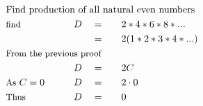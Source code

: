\begin{alignat*}{5}
&\rlap{\text{Find production of all natural even numbers}}\\
&\small\text{find}&D\quad&=\quad&&2*4*6*8*...\\
&\,&\,&=&&2(1*2*3*4*...)\\
&\rlap{\small\text{From the previous proof}}\\
&\,&D\quad&=&&2C\\
&\small\text{As }C=0\normalsize\qquad&D\quad&=&&2\cdot0\\
&\small\text{Thus}&D\quad&=&&0
\end{alignat*}
